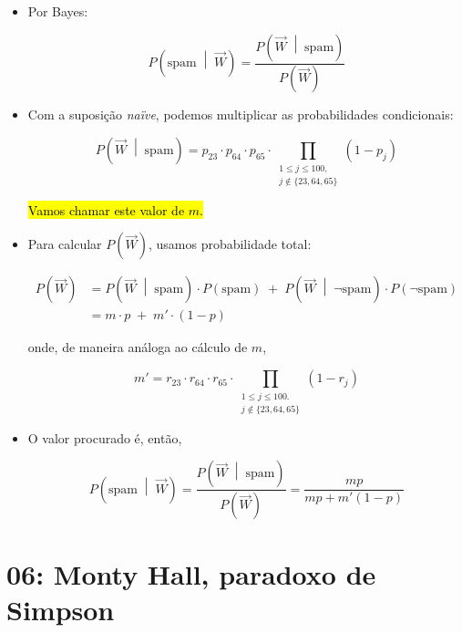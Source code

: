 \documentclass[
  11pt]{report}
\begin{document}
\begin{itemize}
\item
  Por Bayes:

  \[
  P\left( \text{spam} \;\middle|\; \vec W \right) = 
  \frac{P\left(\vec W \;\middle|\; \text{spam} \right)}
  {P\left( \vec W  \right)}
  \]
\item
  Com a suposição \emph{naïve}, podemos multiplicar as probabilidades condicionais:

  \[
  P\left(\vec W\;\middle|\; \text{spam} \right) =
  p_{23} \cdot p_{64} \cdot p_{65} \cdot
  \!\!\!\!\!\!\!\!\!
  \prod_{
    \begin{array}{c}
    1 \leq j \leq 100, \\
    j \not\in \{ 23, 64, 65 \}
    \end{array}
  }
  \!\!\!\!\!\!\!
  (1 - p_j)
  \]

  {\hl{Vamos chamar este valor de $m$.}}
\item
  Para calcular $P\left( \vec W \right)$, usamos probabilidade total:

  \[
  \begin{aligned}
  P\left( \vec W \right) 
  &= 
    P\left(\vec W \;\middle|\; \text{spam} \right) 
    \cdot P(\text{spam})
    \;+\;
    P\left(\vec W \;\middle|\; \neg\text{spam} \right) 
    \cdot P(\neg\text{spam})
  \\
  &=
    m \cdot p \;+\; m' \cdot (1 - p)
  \end{aligned}
  \]

  onde, de maneira análoga ao cálculo de $m$,

  \[
  m' = 
    r_{23} \cdot r_{64} \cdot r_{65} \cdot
  \!\!\!\!\!\!\!\!\!
  \prod_{
    \begin{array}{c}
    1 \leq j \leq 100. \\
    j \not\in \{ 23, 64, 65 \}
    \end{array}
  }
  \!\!\!\!\!\!\!
  (1 - r_j)
  \]
\item
  O valor procurado é, então,

  \[
  P\left( \text{spam} \;\middle|\; \vec W \right) 
  = 
  \frac{P\left(\vec W \;\middle|\; \text{spam} \right)}
  {P\left( \vec W  \right)}
  = \frac{mp}{mp + m'(1 - p)}
  \]
\end{itemize}

\hypertarget{monty-hall-paradoxo-de-simpson}{%
\chapter*{06: Monty Hall, paradoxo de Simpson}\label{monty-hall-paradoxo-de-simpson}}
\end{document}
